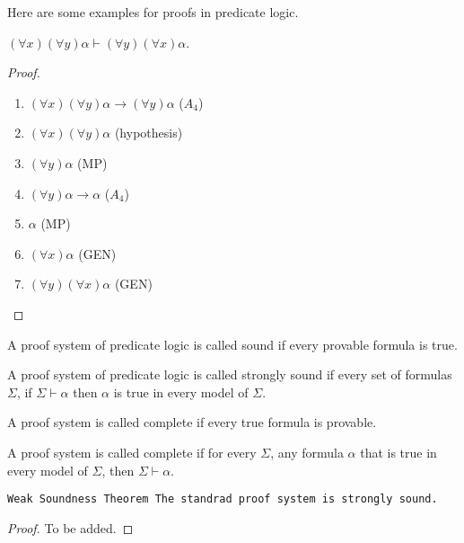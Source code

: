 \documentclass[11pt,a4paper]{article}
\renewcommand{\implies}{\rightarrow}
\begin{document}
  Here are some examples for proofs in predicate logic.

  \begin{proposition}
    $(\forall x)(\forall y) \alpha \vdash (\forall y)(\forall x) \alpha$.
  \end{proposition}
  \begin{proof}
    \begin{enumerate}
      \item $(\forall x)(\forall y) \alpha \implies (\forall y) \alpha$ 
        ($A_4$)
      \item $(\forall x)(\forall y) \alpha$ (hypothesis)
      \item $(\forall y) \alpha$ (MP)
      \item $(\forall y) \alpha \implies \alpha$ ($A_4$)
      \item $\alpha$ (MP)
      \item $(\forall x) \alpha$ (GEN)
      \item $(\forall y)(\forall x) \alpha$ (GEN)
    \end{enumerate}
  \end{proof}

  \begin{definition}
    A proof system of predicate logic is called sound if every provable 
    formula is true.
  \end{definition}

  \begin{definition}
    A proof system of predicate logic is called strongly sound if every 
    set of formulas $\Sigma$, if $\Sigma \vdash \alpha$ then
    $\alpha$ is true in every model of $\Sigma$.
  \end{definition}

  \begin{definition}
    A proof system is called complete if every true formula is provable.
  \end{definition}

  \begin{definition}
    A proof system is called complete if for every $\Sigma$, any formula 
    $\alpha$ that is true in every model of $\Sigma$, then 
    $\Sigma \vdash \alpha$.
  \end{definition}


  \begin{theorem}\tt{Weak Soundness Theorem}
    The standrad proof system is strongly sound.
  \end{theorem}
  \begin{proof}
    To be added.
  \end{proof}
\end{document}
